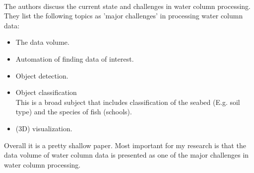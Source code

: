 \cite{buelens2006computational}\\
The authors discuss the current state and challenges in water column processing. They list the following topics as 'major challenges' in processing water column data:
\begin{itemize}
\item The data volume.
\item Automation of finding data of interest.
\item Object detection.
\item Object classification\\This is a broad subject that includes classification of the seabed (E.g. soil type) and the species of fish (schools).
\item (3D) visualization.
\end{itemize}

Overall it is a pretty shallow paper. Most important for my research is that the data volume of water column data is presented as one of the major challenges in water column processing. 